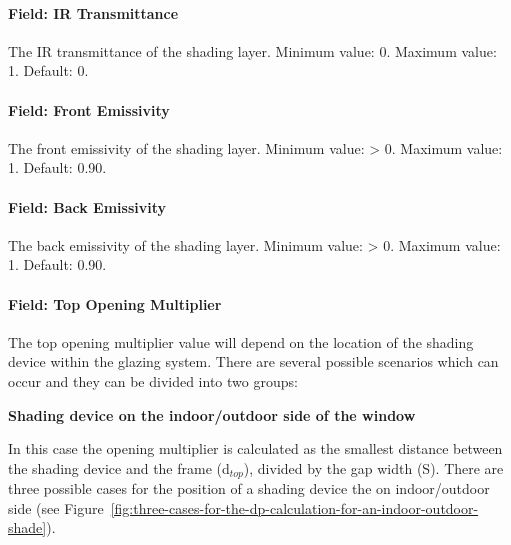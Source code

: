 \paragraph{Field: IR Transmittance}\label{field-ir-transmittance}

The IR transmittance of the shading layer. Minimum value: 0. Maximum value: 1. Default: 0.

\paragraph{Field: Front Emissivity}\label{field-front-emissivity}

The front emissivity of the shading layer. Minimum value: > 0. Maximum value: 1. Default: 0.90.

\paragraph{Field: Back Emissivity}\label{field-back-emissivity}

The back emissivity of the shading layer. Minimum value: > 0. Maximum value: 1. Default: 0.90.

\paragraph{Field: Top Opening Multiplier}\label{field-top-opening-multiplier-1}

The top opening multiplier value will depend on the location of the shading device within the glazing system. There are several possible scenarios which can occur and they can be divided into two groups:

\textbf{Shading device on the indoor/outdoor side of the window}

In this case the opening multiplier is calculated as the smallest distance between the shading device and the frame (d\(_{top}\)), divided by the gap width (S). There are three possible cases for the position of a shading device the on indoor/outdoor side (see Figure~\ref{fig:three-cases-for-the-dp-calculation-for-an-indoor-outdoor-shade}).

